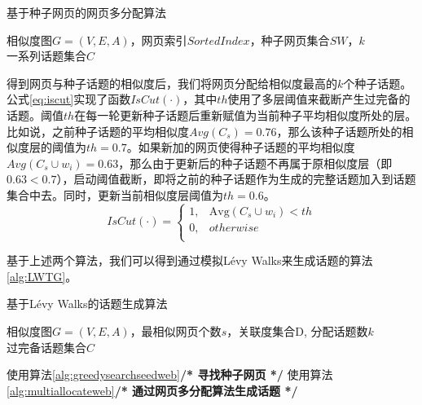 \begin{algorithm}[!htbp]
    \caption{基于种子网页的网页多分配算法}\label{alg:multiallocateweb}
    \hspace*{0.02in}{\bf Input:}
    相似度图$G=(V,E,A)$，网页索引$SortedIndex$，种子网页集合$SW$，$k$\\
    \hspace*{0.02in}{\bf Output:}
    一系列话题集合$C$
\end{algorithm}

得到网页与种子话题的相似度后，我们将网页分配给相似度最高的$k$个种子话题。公式\ref{eq:iscut}实现了函数$IsCut(\cdot)$，其中$th$使用了多层阈值来截断产生过完备的话题。阈值$th$在每一轮更新种子话题后重新赋值为当前种子平均相似度所处的层。比如说，之前种子话题的平均相似度$Avg(C_s)=0.76$，那么该种子话题所处的相似度层的阈值为$th=0.7$。如果新加的网页使得种子话题的平均相似度$Avg(C_s\cup w_i)=0.63$，那么由于更新后的种子话题不再属于原相似度层（即$0.63<0.7$），启动阈值截断，即将之前的种子话题作为生成的完整话题加入到话题集合中去。同时，更新当前相似度层阈值为$th=0.6$。
\begin{equation} \label{eq:iscut}
IsCut(\cdot) = 
\begin{cases}
1, & \text{Avg}(C_s\cup w_i) < th\\
0, & otherwise\\
\end{cases}
\end{equation}

基于上述两个算法，我们可以得到通过模拟L\'evy Walks来生成话题的算法\ref{alg:LWTG}。
\begin{algorithm}[!htbp]
    \caption{基于L\'evy Walks的话题生成算法}\label{alg:LWTG}
    \hspace*{0.02in}{\bf Input:}
    相似度图$G=(V,E,A)$，最相似网页个数$s$，关联度集合D, 分配话题数$k$\\
    \hspace*{0.02in}{\bf Output:}
    过完备话题集合$C$ 
    \begin{algorithmic}
            \State 使用算法\ref{alg:greedysearchseedweb}\qquad \qquad \textbf{/* 寻找种子网页 */}
            \State 使用算法\ref{alg:multiallocateweb}\qquad \qquad \textbf{/* 通过网页多分配算法生成话题 */}
        \EndFor
    \end{algorithmic}
\end{algorithm}


